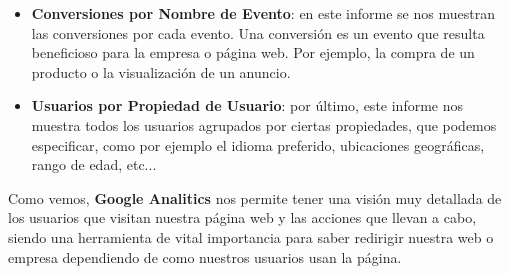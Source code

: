 \begin{itemize}
\begin{itemize}
        \item \textbf{Conversiones por Nombre de Evento}: en este informe se nos muestran las conversiones por cada evento. Una conversión es un evento que resulta beneficioso para la empresa o página web. Por ejemplo, la compra de un producto o la visualización de un anuncio.

        \item \textbf{Usuarios por Propiedad de Usuario}: por último, este informe nos muestra todos los usuarios agrupados por ciertas propiedades, que podemos especificar, como por ejemplo el idioma preferido, ubicaciones geográficas, rango de edad, etc...
    \end{itemize}
\end{itemize}

Como vemos, \textbf{Google Analitics} nos permite tener una visión muy detallada de los usuarios que visitan nuestra página web y las acciones que llevan a cabo, siendo una herramienta de vital importancia para saber redirigir nuestra web o empresa dependiendo de como nuestros usuarios usan la página.





%
%

